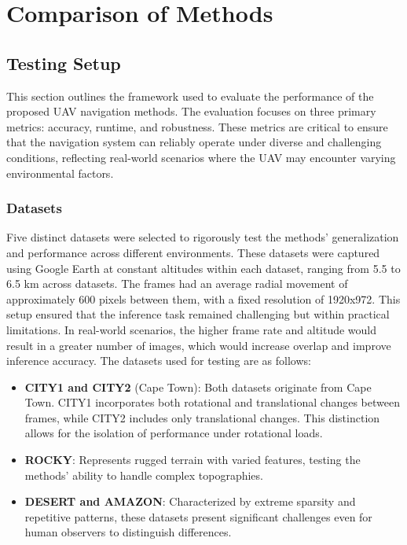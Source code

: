 \chapter{Comparison of Methods}



\section{Testing Setup}

This section outlines the framework used to evaluate the performance of the proposed UAV navigation methods. The evaluation focuses on three primary metrics: accuracy, runtime, and robustness. These metrics are critical to ensure that the navigation system can reliably operate under diverse and challenging conditions, reflecting real-world scenarios where the UAV may encounter varying environmental factors.

\subsection{Datasets}
Five distinct datasets were selected to rigorously test the methods' generalization and performance across different environments. These datasets were captured using Google Earth at constant altitudes within each dataset, ranging from 5.5 to 6.5 km across datasets. The frames had an average radial movement of approximately 600 pixels between them, with a fixed resolution of 1920x972. This setup ensured that the inference task remained challenging but within practical limitations. In real-world scenarios, the higher frame rate and altitude would result in a greater number of images, which would increase overlap and improve inference accuracy. The datasets used for testing are as follows:

\begin{itemize}
    \item \textbf{CITY1 and CITY2} (Cape Town): Both datasets originate from Cape Town. CITY1 incorporates both rotational and translational changes between frames, while CITY2 includes only translational changes. This distinction allows for the isolation of performance under rotational loads.
    \item \textbf{ROCKY}: Represents rugged terrain with varied features, testing the methods' ability to handle complex topographies.
    \item \textbf{DESERT and AMAZON}: Characterized by extreme sparsity and repetitive patterns, these datasets present significant challenges even for human observers to distinguish differences.
\end{itemize}


